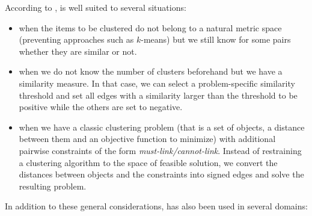 According to \textcite[Section 5]{Demaine2006}, \pcc{} is well suited to several situations:
\begin{itemize}
   \item when the items to be clustered do not belong to a natural metric space (preventing
      approaches such as $k$-means) but we still know for some pairs whether they are similar or
      not.
   \item when we do not know the number of clusters beforehand but we have a similarity measure. In
      that case, we can select a problem-specific similarity threshold and set all edges with a
      similarity larger than the threshold to be positive while the others are set to negative.
   \item when we have a classic clustering problem (that is a set of objects, a distance between
      them and an objective function to minimize) with additional pairwise constraints of the form
      \emph{must-link/cannot-link}. Instead of restraining a clustering algorithm to the space of
      feasible solution, we convert the distances between objects and the constraints into signed
      edges and solve the resulting \pcc{} problem. 
\end{itemize}

In addition to these general considerations, \pcc{} has also been used in several domains:
